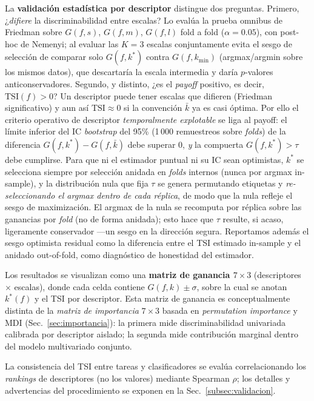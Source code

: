 \documentclass[conference]{IEEEtran}
\begin{document}
La \textbf{validación estadística por descriptor} distingue dos preguntas. Primero, ¿\emph{difiere} la discriminabilidad entre escalas? Lo evalúa la prueba omnibus de Friedman sobre $G(f,s)$, $G(f,m)$, $G(f,l)$ fold a fold ($\alpha=0.05$), con post-hoc de Nemenyi; al evaluar las $K=3$ escalas conjuntamente evita el sesgo de selección de comparar solo $G(f,k^*)$ contra $G(f,k_{\min})$ (argmax/argmin sobre los mismos datos), que descartaría la escala intermedia y daría $p$-valores anticonservadores. Segundo, y distinto, ¿es el \emph{payoff} positivo, es decir, $\mathrm{TSI}(f)>0$? Un descriptor puede tener escalas que difieren (Friedman significativo) y aun así $\mathrm{TSI}\approx 0$ si la convención $\bar k$ ya es casi óptima. Por ello el criterio operativo de descriptor \emph{temporalmente explotable} se liga al payoff: el límite inferior del IC \textit{bootstrap} del 95\% (1\,000 remuestreos sobre \textit{folds}) de la diferencia $G(f,k^*)-G(f,\bar k)$ debe superar $0$, \emph{y} la compuerta $G(f,k^*)>\tau$ debe cumplirse. Para que ni el estimador puntual ni su IC sean optimistas, $k^*$ se selecciona siempre por selección anidada en \textit{folds} internos (nunca por argmax in-sample), y la distribución nula que fija $\tau$ se genera permutando etiquetas y \emph{re-seleccionando el argmax dentro de cada réplica}, de modo que la nula refleje el sesgo de maximización. El argmax de la nula se recomputa por réplica sobre las ganancias por \textit{fold} (no de forma anidada); esto hace que $\tau$ resulte, si acaso, ligeramente conservador ---un sesgo en la dirección segura. Reportamos además el sesgo optimista residual como la diferencia entre el TSI estimado in-sample y el anidado out-of-fold, como diagnóstico de honestidad del estimador.


Los resultados se visualizan como una \textbf{matriz de ganancia $7\times 3$} (descriptores $\times$ escalas), donde cada celda contiene $G(f,k)\pm\sigma$, sobre la cual se anotan $k^*(f)$ y el TSI por descriptor. Esta matriz de ganancia es conceptualmente distinta de la \emph{matriz de importancia} $7\times 3$ basada en \textit{permutation importance} y MDI (Sec.~\ref{sec:importancia}): la primera mide discriminabilidad univariada calibrada por descriptor aislado; la segunda mide contribución marginal dentro del modelo multivariado conjunto.

La consistencia del TSI entre tareas y clasificadores se evalúa correlacionando los \emph{rankings} de descriptores (no los valores) mediante Spearman $\rho$; los detalles y advertencias del procedimiento se exponen en la Sec.~\ref{subsec:validacion}.
\end{document}
